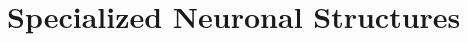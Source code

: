 \documentclass[class={myRUCProject}, crop=false]{standalone}
\begin{document}
  

\section{Specialized Neuronal Structures}
\end{document}
